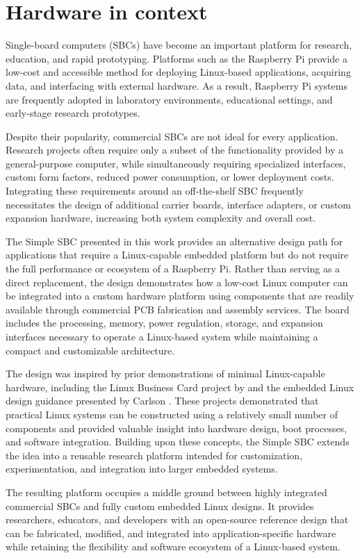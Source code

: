 \section{Hardware in context}

Single-board computers (SBCs) have become an important platform for research, education, 
and rapid prototyping. 
Platforms such as the Raspberry Pi provide a low-cost and accessible method for deploying Linux-based 
applications, acquiring data, and interfacing with external hardware. 
As a result, Raspberry Pi systems are frequently adopted in laboratory environments, 
educational settings, and early-stage research prototypes.

Despite their popularity, commercial SBCs are not ideal for every application. 
Research projects often require only a subset of the functionality provided by a general-purpose 
computer, while simultaneously requiring specialized interfaces, custom form factors, 
reduced power consumption, or lower deployment costs. 
Integrating these requirements around an off-the-shelf SBC frequently necessitates the design of 
additional carrier boards, interface adapters, or custom expansion hardware, 
increasing both system complexity and overall cost.

The Simple SBC presented in this work provides an alternative design path for 
applications that require a Linux-capable embedded platform but do not require 
the full performance or ecosystem of a Raspberry Pi. 
Rather than serving as a direct replacement, 
the design demonstrates how a low-cost Linux computer can be integrated into a 
custom hardware platform using components that are readily available through 
commercial PCB fabrication and assembly services. 
The board includes the processing, memory, power regulation, storage, 
and expansion interfaces necessary to operate a Linux-based system while 
maintaining a compact and customizable architecture.

The design was inspired by prior demonstrations of minimal Linux-capable hardware, 
including the Linux Business Card project by \citeauthor{hilliard_business_card_linux_2019} 
\cite{hilliard_business_card_linux_2019} and the embedded Linux design guidance presented 
by Carlson \cite{carlson_embedded_linux}. These projects demonstrated that practical 
Linux systems can be constructed using a relatively small number of components and 
provided valuable insight into hardware design, boot processes, and software integration. 
Building upon these concepts, the Simple SBC extends the idea into a reusable research 
platform intended for customization, experimentation, and integration into larger embedded systems.

The resulting platform occupies a middle ground between highly integrated commercial SBCs 
and fully custom embedded Linux designs. It provides researchers, educators, and developers 
with an open-source reference design that can be fabricated, modified, and integrated 
into application-specific hardware while retaining the flexibility and software 
ecosystem of a Linux-based system.
